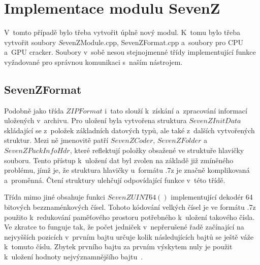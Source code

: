 %

\section{Implementace modulu SevenZ}
V~tomto případě bylo třeba vytvořit úplně nový modul. K~tomu bylo třeba vytvořit soubory {\textit
SevenZModule.cpp, SevenZFormat.cpp} a~soubory pro CPU a~GPU cracker. Soubory v~sobě nesou
stejnojmenné třídy implementující funkce vyžadované pro správnou komunikaci s~naším nástrojem.

\subsection{SevenZFormat}
Podobně jako třída $ZIPFormat$ i~tato slouží k~získání a~zpracování informací uložených
v~archivu. Pro uložení byla vytvořena struktura $SevenZInitData$ skládající se z~položek základních
datových typů, ale také z~dalších vytvořených struktur. Mezi ně jmenovitě patří $SevenZCoder$,
$SevenZFolder$ a~$SevenZPackInfoHdr$, které reflektují položky obsažené ve struktuře hlavičky
souboru. Tento přístup k~uložení dat byl zvolen na základě již zmíněného problému, jímž je, že
struktura hlavičky u~formátu .7z je značně komplikovaná a~proměnná. Čtení struktury ulehčují
odpovídající funkce v~této třídě.

 Třída mimo jiné obsahuje funkci $SevenZUINT64()$ implementující dekodér 64 bitových
bezznaménkových čísel. Tohoto kódování velkých čísel je ve formátu .7z použito k~redukování
paměťového prostoru potřebného k~uložení takového čísla. Ve zkratce to funguje tak, že počet
jedniček v~nepřerušené řadě začínající na nejvyšších pozicích v~prvním bajtu určuje kolik
následujících bajtů se ještě váže k~tomuto číslu. Zbytek prvního bajtu za prvním výskytem nuly je
použit k~uložení hodnoty nejvýznamnějšího bajtu~\cite{Pavlov:2010}. 

